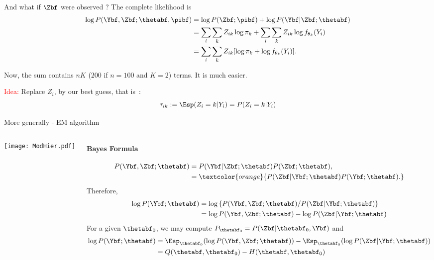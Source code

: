 \begin{frame}{And what if $\Zbf$ were observed  ?}
The complete likelihood is 
\begin{align*}
    \log P(\Ybf, \Zbf; \thetabf, \pibf) &=\log P(\Zbf; \pibf) + \log P(\Ybf\vert \Zbf; \thetabf)\\
      & =  \sum_i \sum_k Z_{ik} \log \pi_k + \sum_i \sum_k Z_{ik} \log
    f_{\theta_k}(Y_i) \\
    & =  \sum_i \sum_k Z_{ik} [\log \pi_k + \log
      f_{\theta_k}(Y_i)].
\end{align*}
  
Now, the sum contains $nK$ ($200$ if $n=100$ and $K=2$) terms.  It is much easier.
\pause

\centering{\textcolor{red}{Unfortunately $\Zbf$ are unknown.} }
\pause

\bigskip

\textcolor{red}{Idea:} Replace $Z_i$, by our best guess, that is~:
$$
\tau_{ik}:=\Esp(Z_i = k | Y_i)=P(Z_i = k | Y_i)
$$  
\end{frame}

\begin{frame}{More generally - EM algorithm}
\begin{columns}
\begin{column}{0.2\textwidth}
\texttt{[image: ModHier.pdf]}
\end{column}
\begin{column}{0.8\textwidth}
\paragraph{Bayes Formula}
{\small
\begin{align*}
P(\Ybf, \Zbf;\thetabf) & = P(\Ybf\vert \Zbf; \thetabf) P(\Zbf; \thetabf),\\
& = \textcolor{orange}{P(\Zbf\vert \Ybf; \thetabf) P(\Ybf; \thetabf).}
\end{align*}
Therefore,
\begin{align*}
\log P(\Ybf; \thetabf) & = \log \left \lbrace P(\Ybf, \Zbf;\thetabf) / P(\Zbf\vert \Ybf; \thetabf) \right\rbrace\\
& = \log P(\Ybf, \Zbf;\thetabf) - \log P(\Zbf\vert \Ybf; \thetabf) \\
\end{align*}
For a given $\thetabf_0$, we may compute $P_{\thetabf_0}=P(\Zbf\vert \thetabf_0, \Ybf)$ and
\begin{align*}
\log P(\Ybf; \thetabf) &= \Esp_{\thetabf_0}(\log P(\Ybf, \Zbf;\thetabf)) - \Esp_{\thetabf_0}(\log P(\Zbf\vert \Ybf; \thetabf))\\
  & = Q(\thetabf, \thetabf_0) - H(\thetabf, \thetabf_0)
  \end{align*}}
\end{column}
\end{columns}
\end{frame}


